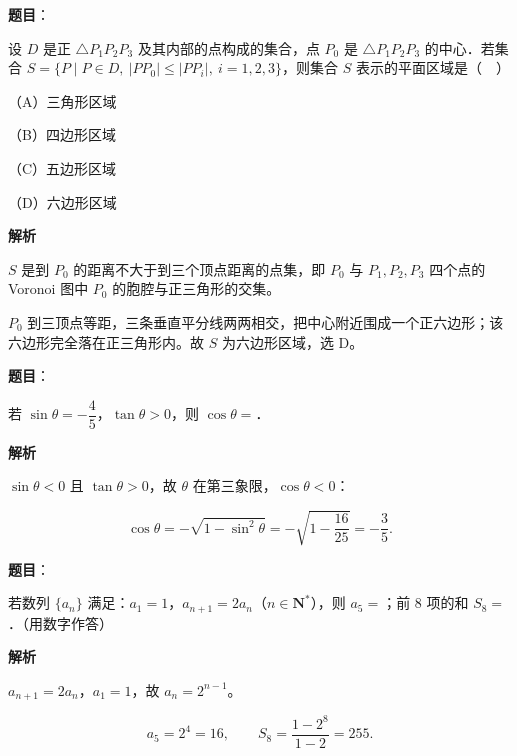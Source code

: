 \begin{answer}

\textbf{题目}：

设 $D$ 是正 $\triangle P_1P_2P_3$ 及其内部的点构成的集合，点 $P_0$ 是 $\triangle P_1P_2P_3$ 的中心．若集合 $S=\{P\mid P\in D,\ |PP_0|\leqslant|PP_i|,\ i=1,2,3\}$，则集合 $S$ 表示的平面区域是（　）

（A）三角形区域

（B）四边形区域

（C）五边形区域

（D）六边形区域

\textbf{解析}

$S$ 是到 $P_0$ 的距离不大于到三个顶点距离的点集，即 $P_0$ 与 $P_1,P_2,P_3$ 四个点的 Voronoi 图中 $P_0$ 的胞腔与正三角形的交集。

$P_0$ 到三顶点等距，三条垂直平分线两两相交，把中心附近围成一个正六边形；该六边形完全落在正三角形内。故 $S$ 为六边形区域，选 D。


\end{answer}
\begin{answer}

\textbf{题目}：

若 $\sin\theta=-\dfrac45$，$\tan\theta>0$，则 $\cos\theta=$\gkblank{}．

\textbf{解析}

$\sin\theta<0$ 且 $\tan\theta>0$，故 $\theta$ 在第三象限，$\cos\theta<0$：

\nopagebreak[4]
\[\cos\theta=-\sqrt{1-\sin^2\theta}=-\sqrt{1-\frac{16}{25}}=-\frac35 .\]


\end{answer}
\begin{answer}

\textbf{题目}：

若数列 $\{a_n\}$ 满足：$a_1=1$，$a_{n+1}=2a_n$（$n\in\mathbf N^*$），则 $a_5=$\gkblank{}；前 $8$ 项的和 $S_8=$\gkblank{}．（用数字作答）

\textbf{解析}

$a_{n+1}=2a_n$，$a_1=1$，故 $a_n=2^{n-1}$。

\nopagebreak[4]
\[a_5=2^4=16,\qquad S_8=\frac{1-2^8}{1-2}=255 .\]


\end{answer}
